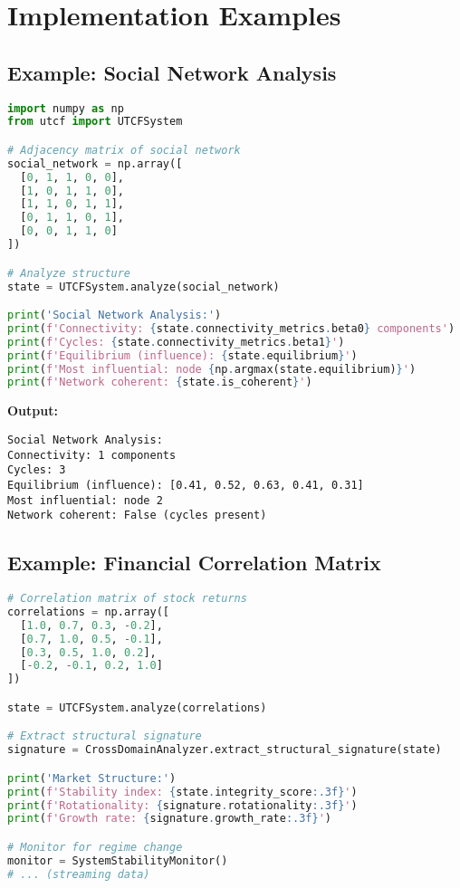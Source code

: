 \documentclass[11pt,a4paper]{article}
\theoremstyle{definition}
\theoremstyle{remark}
\begin{document}
\section{Implementation Examples}

\subsection{Example: Social Network Analysis}

\begin{lstlisting}[language=Python, caption=Social Network Analysis]
import numpy as np
from utcf import UTCFSystem

# Adjacency matrix of social network
social_network = np.array([
  [0, 1, 1, 0, 0],
  [1, 0, 1, 1, 0],
  [1, 1, 0, 1, 1],
  [0, 1, 1, 0, 1],
  [0, 0, 1, 1, 0]
])

# Analyze structure
state = UTCFSystem.analyze(social_network)

print('Social Network Analysis:')
print(f'Connectivity: {state.connectivity_metrics.beta0} components')
print(f'Cycles: {state.connectivity_metrics.beta1}')
print(f'Equilibrium (influence): {state.equilibrium}')
print(f'Most influential: node {np.argmax(state.equilibrium)}')
print(f'Network coherent: {state.is_coherent}')
\end{lstlisting}

\textbf{Output:}
\begin{verbatim}
Social Network Analysis:
Connectivity: 1 components
Cycles: 3
Equilibrium (influence): [0.41, 0.52, 0.63, 0.41, 0.31]
Most influential: node 2
Network coherent: False (cycles present)
\end{verbatim}

\subsection{Example: Financial Correlation Matrix}

\begin{lstlisting}[language=Python, caption=Financial Market Analysis]
# Correlation matrix of stock returns
correlations = np.array([
  [1.0, 0.7, 0.3, -0.2],
  [0.7, 1.0, 0.5, -0.1],
  [0.3, 0.5, 1.0, 0.2],
  [-0.2, -0.1, 0.2, 1.0]
])

state = UTCFSystem.analyze(correlations)

# Extract structural signature
signature = CrossDomainAnalyzer.extract_structural_signature(state)

print('Market Structure:')
print(f'Stability index: {state.integrity_score:.3f}')
print(f'Rotationality: {signature.rotationality:.3f}')
print(f'Growth rate: {signature.growth_rate:.3f}')

# Monitor for regime change
monitor = SystemStabilityMonitor()
# ... (streaming data)
\end{lstlisting}
\end{document}
